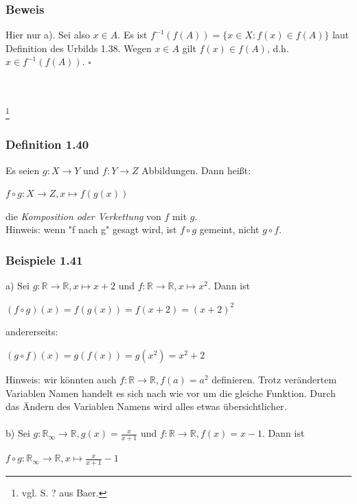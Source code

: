 \documentclass{article}
\begin{document}
\subsubsection*{Beweis}
Hier nur a). Sei also $x \in A$. Es ist $f^{-1}(f(A)) = \{x \in X: f(x) \in f(A)\}$ laut Definition des Urbilds 1.38. 
Wegen $x \in A$ gilt $f(x) \in f(A)$, d.h. $x \in f^{-1}(f(A))$. $\square$
\\
\\
\\
\date{Mittwoch, 01.11.23} \footnote{vgl. S. ? aus Baer.}

\subsubsection*{Definition 1.40}
Es seien $g: X \rightarrow Y$ und $f: Y \rightarrow Z$ Abbildungen. Dann heißt:
\begin{center}
    $f \circ g: X \rightarrow Z, x \mapsto f(g(x))$
\end{center}
die \textit{Komposition oder Verkettung} von $f$ mit $g$. \\
Hinweis: wenn "f nach g" gesagt wird, ist $f \circ g$ gemeint, nicht $g \circ f$.

\subsubsection*{Beispiele 1.41}
a) Sei $g: \mathbb{R} \rightarrow \mathbb{R}, x \mapsto x+2$ und $f: \mathbb{R} \rightarrow \mathbb{R}, x \mapsto x^2$. Dann ist 
\begin{center}
    $(f \circ g)(x) = f(g(x)) = f(x+2) = (x+2)^2$
\end{center}
andererseits: 
\begin{center}
$(g \circ f)(x) = g(f(x)) = g(x^2) = x^2 + 2$ \\
\end{center}
Hinweis: wir könnten auch $f: \mathbb{R} \rightarrow \mathbb{R}, f(a) = a^2$ definieren. Trotz verändertem Variablen Namen handelt es sich nach wie vor um die gleiche Funktion. Durch das Ändern des Variablen Namens wird alles etwas übersichtlicher. \\
\\
b) Sei $g: \mathbb{R_\infty} \rightarrow \mathbb{R}, g(x) = \frac{x}{x+1}$ und $f: \mathbb{R} \rightarrow \mathbb{R}, f(x) = x - 1$. Dann ist
\begin{center}
    $f \circ g: \mathbb{R_\infty} \rightarrow \mathbb{R}, x \mapsto \frac{x}{x+1} - 1$
\end{center}
\end{document}
